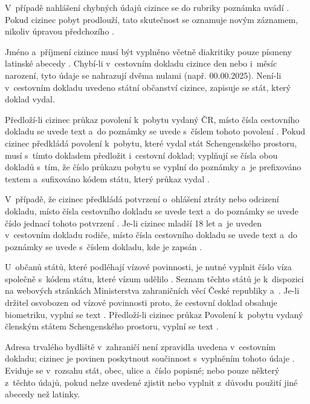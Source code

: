 V~případě nahlášení chybných údajů cizince se do rubriky poznámka uvádí  \cite[bod č. 7]{www-registrace-pokyny}.
Pokud cizinec pobyt prodlouží, tato skutečnost se oznamuje novým záznamem, nikoliv úpravou předchozího \cite[r. č. 1.1]{www-registrace-pokyny}.

Jméno a~příjmení cizince musí být vyplněno včetně diakritiky pouze písmeny latinské abecedy \cite[r. č. 1.2–1.3]{www-registrace-pokyny}.
Chybí-li v~cestovním dokladu cizince den nebo i~měsíc narození, tyto údaje se nahrazují dvěma nulami (např. 00.00.2025).
Není-li v~cestovním dokladu uvedeno státní občanství cizince, zapisuje se stát, který doklad vydal.

Předloží-li cizinec průkaz povolení k~pobytu vydaný ČR, místo čísla cestovního dokladu se uvede text  a~do poznámky se uvede  s~číslem tohoto povolení \cite[r. č. 6.2]{www-registrace-pokyny}.
Pokud cizinec předkládá povolení k~pobytu, které vydal stát Schengenského prostoru, musí s~tímto dokladem předložit i~cestovní doklad; vyplňují se čísla obou dokladů s~tím, že číslo průkazu pobytu se vyplní do poznámky a~je prefixováno textem  a~sufixováno kódem státu, který průkaz vydal \cite[r. č. 6.3 a~10.4]{cz-1999-326}.

V~případě, že cizinec předkládá potvrzení o~ohlášení ztráty nebo odcizení dokladu, místo čísla cestovního dokladu se uvede text  a~do poznámky se uvede číslo jednací tohoto potvrzení \cite[r. č. 6.5 a~10.1]{www-registrace-pokyny}.
Je-li cizinec mladší 18 let a~je uveden v~cestovním dokladu rodiče, místo čísla cestovního dokladu se uvede text  a~do poznámky se uvede  s~číslem dokladu, kde je zapsán \cite[r. č. 6.7 a~10.5]{www-registrace-pokyny}.

U~občanů států, které podléhají vízové povinnosti, je nutné vyplnit číslo víza společně s~kódem státu, které vízum udělilo \cite[r. č. 7.1–7.4]{www-registrace-pokyny}.
Seznam těchto států je k~dispozici na webových stránkách Ministerstva zahraničních věcí České republiky \cite{www-mzcr-viza2} a~\cite{www-mzcr-viza1}.
Je-li držitel osvobozen od vízové povinnosti proto, že cestovní doklad obsahuje biometriku, vyplní se text  \cite[r. č. 7.6]{www-registrace-pokyny}.
Předloží-li cizinec průkaz Povolení k~pobytu vydaný členským státem Schengenského prostoru, vyplní se text  \cite[r. č. 7.7]{www-registrace-pokyny}.

Adresa trvalého bydliště v~zahraničí není zpravidla uvedena v~cestovním dokladu; cizinec je povinen poskytnout součinnost s~vyplněním tohoto údaje \cite[\S~103(b)]{cz-1999-326}.
Eviduje se v~rozsahu stát, obec, ulice a~číslo popisné; nebo pouze některý z~těchto údajů, pokud nelze uvedené zjistit nebo vyplnit z~důvodu použití jiné abecedy než latinky.

